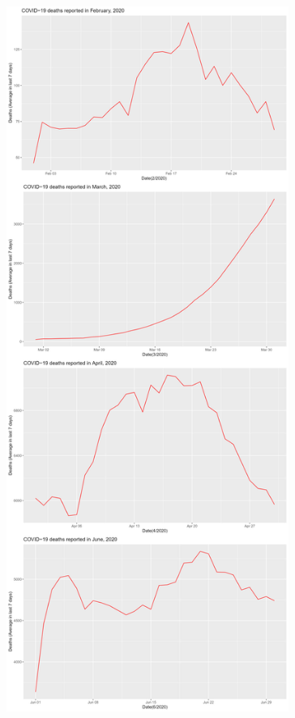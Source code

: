 \documentclass[a4paper]{article}
\theoremstyle{definition}
\begin{document}
\begin{enumerate}[i)]
\begin{enumerate}[1)]
\begin{figure}[H]
				\includegraphics[height=23cm,width=13cm]{images/8.2.1.png}
			\end{figure}
			\begin{figure}[H]
				\centering

\end{figure}
\end{enumerate}
\end{enumerate}
\end{document}
